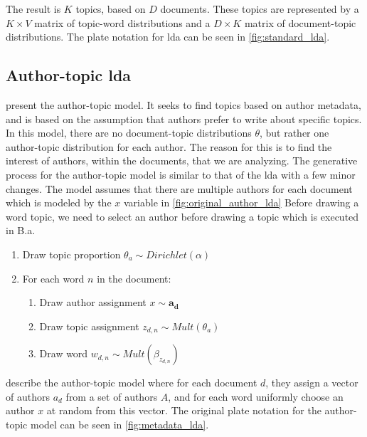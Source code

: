 The result is $K$ topics, based on $D$ documents.
These topics are represented by a $K \times V$ matrix of topic-word distributions and a $D \times K$ matrix of document-topic distributions.
The plate notation for \gls{lda} can be seen in \autoref{fig:standard_lda}.





\subsection{Author-topic \gls{lda}}\label{subsec:auth_prelim} 
\citet{author_topic_2012} present the author-topic model.
It seeks to find topics based on author metadata, and is based on the assumption that authors prefer to write about specific topics.
In this model, there are no document-topic distributions $\theta$, but rather one author-topic distribution for each author.
The reason for this is to find the interest of authors, within the documents, that we are analyzing.
The generative process for the author-topic model is similar to that of the \gls{lda} with a few minor changes.
The model assumes that there are multiple authors for each document which is modeled by the $x$ variable in \autoref{fig:original_author_lda}
Before drawing a word topic, we need to select an author before drawing a topic which is executed in B.a.
\vspace{\topsep}
\begin{enumerate}
	\item Draw topic proportion $\theta_a \sim Dirichlet(\alpha)$
	\item For each word $n$ in the document:
	\begin{enumerate}
		\item Draw author assignment $x \sim \boldsymbol{a_d}$
		\item Draw topic assignment $z_{d,n} \sim Mult(\theta_a)$
		\item Draw word $w_{d,n} \sim Mult(\beta_{z_{d,n}})$
	\end{enumerate}
\end{enumerate}
\vspace{\topsep}

\citet{author_topic_2012} describe the author-topic model where for each document $d$, they assign a vector of authors $a_d$ from a set of authors $A$, and for each word uniformly choose an author $x$ at random from this vector.
The original plate notation for the author-topic model can be seen in \autoref{fig:metadata_lda}.

